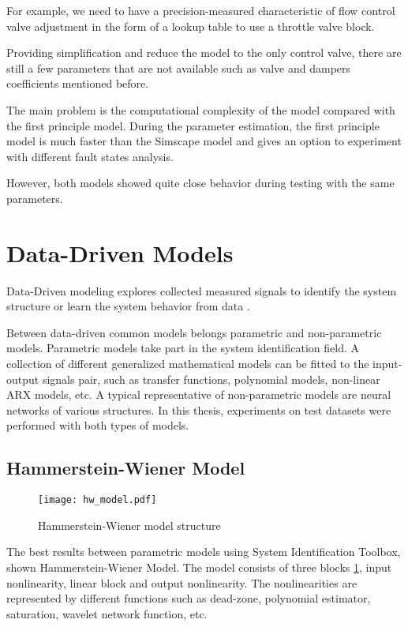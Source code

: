 For example, we need to have a precision-measured characteristic of flow
control valve adjustment in the form of a lookup table to use a throttle
valve block.

Providing simplification and reduce the model to the only control valve,
there are still a few parameters that are not available such as valve and
dampers coefficients mentioned before.

The main problem is the computational complexity of the model compared with
the first principle model. During the parameter estimation, the first
principle model is much faster than the Simscape model and gives an option
to experiment with different fault states analysis. 

However, both models showed quite close behavior during testing with the
same parameters.

\section{Data-Driven Models}
Data-Driven modeling explores collected measured signals to identify the
system structure or learn the system behavior from data \cite{ident}.

Between data-driven common models belongs parametric and non-parametric
models. Parametric models take part in the system identification field. A
collection of different generalized mathematical models can be fitted to
the input-output signals pair, such as transfer functions, polynomial
models, non-linear ARX models, etc.   A typical representative of
non-parametric models are neural networks of various structures.  In this
thesis, experiments on test datasets were performed with both types of
models. 

\subsection{Hammerstein-Wiener Model}

\begin{figure}[h!]
    \centering
    \texttt{[image: hw\_model.pdf]}
    \caption{Hammerstein-Wiener model structure}
    \label{fig:hw_model}
\end{figure}

The best results between parametric models using System Identification
Toolbox, shown Hammerstein-Wiener Model. The model consists of three blocks
\ref{fig:hw_model}, input nonlinearity, linear block and output
nonlinearity.  The nonlinearities are represented by different functions
such as dead-zone, polynomial estimator, saturation, wavelet network
function, etc. 

